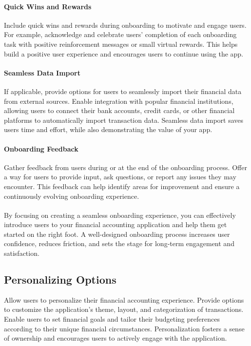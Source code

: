 \paragraph{Quick Wins and Rewards}
Include quick wins and rewards during onboarding to motivate and engage users. For example, 
acknowledge and celebrate users' completion of each onboarding task with positive reinforcement messages or small 
virtual rewards. This helps build a positive user experience and encourages users to continue using the app.

\paragraph{Seamless Data Import}
If applicable, provide options for users to seamlessly import their financial data from external 
sources. Enable integration with popular financial institutions, allowing users to connect their bank accounts, credit 
cards, or other financial platforms to automatically import transaction data. Seamless data import saves users time 
and effort, while also demonstrating the value of your app.

\paragraph{Onboarding Feedback}
Gather feedback from users during or at the end of the onboarding process. Offer a way for users 
to provide input, ask questions, or report any issues they may encounter. This feedback can help identify areas for 
improvement and ensure a continuously evolving onboarding experience.\\
\\

By focusing on creating a seamless onboarding experience, you can effectively introduce users to your financial 
accounting application and help them get started on the right foot. A well-designed onboarding process increases 
user confidence, reduces friction, and sets the stage for long-term engagement and satisfaction.


\subsection{Personalizing Options}

Allow users to personalize their financial accounting experience. Provide options to customize the application's 
theme, layout, and categorization of transactions. Enable users to set financial goals and tailor their budgeting 
preferences according to their unique financial circumstances. Personalization fosters a sense of ownership and 
encourages users to actively engage with the application.

